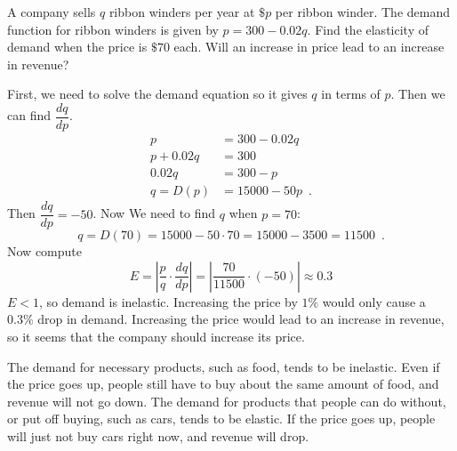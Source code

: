 \begin{example}
A company sells $q$ ribbon winders per year at $\$p$ per ribbon winder. The demand function for ribbon winders is given by $p=300-0.02q$. Find the elasticity of demand when the price is $\$70$ each. Will an increase in price lead to an increase in revenue?

\begin{solution} First, we need to solve the demand equation so it gives $q$ in terms of $p$. Then we can find $\dfrac{dq}{dp}$. 
    \begin{align*}
    p &= 300-0.02q \\
    p + 0.02q &= 300 \\
    0.02 q &= 300 - p \\  
    q = D(p) &= 15000-50p \enspace .
    \end{align*} 
Then $\dfrac{dq}{dp}=-50$. Now We need to find $q$ when $p=70$:
$$ q = D(70) = 15000 - 50\cdot 70 = 15000 - 3500 = 11500 \enspace .$$
Now compute
$$ E=\left| \frac{p}{q}\cdot\frac{dq}{dp} \right|=\left| \frac{70}{11500}\cdot(-50) \right| \approx 0.3 $$
$E<1$, so demand is inelastic. Increasing the price by $1\%$ would only cause a $0.3\%$ drop in demand. Increasing the price would lead to an increase in revenue, so it seems that the company should increase its price.
\end{solution}\end{example}

The demand for necessary products, such as food, tends to be inelastic. Even if the price goes up, people still have to buy about the same amount of food, and revenue will not go down. The demand for products that people can do without, or put off buying, such as cars, tends to be elastic. If the price goes up, people will just not buy cars right now, and revenue will drop.

